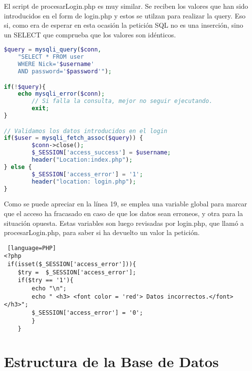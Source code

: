 \documentclass[12pt]{report}
\begin{document}
El script de procesarLogin.php es muy similar. Se reciben los valores que han sido introducidos en el form de login.php y estos se utilzan para realizar la query. Eso si, como era de esperar en esta ocasión la petición SQL no es una inserción, sino un SELECT que comprueba que los valores son idénticos.
\newline
\begin{lstlisting}[language=PHP]
$query = mysqli_query($conn, 
    "SELECT * FROM user 
    WHERE Nick='$username' 
    AND password='$password'");

if(!$query){ 
    echo mysqli_error($conn);
        // Si falla la consulta, mejor no seguir ejecutando.
        exit;
} 

// Validamos los datos introducidos en el login
if($user = mysqli_fetch_assoc($query)) {
        $conn->close();
        $_SESSION['access_success'] = $username;
        header("Location:index.php");
} else {
        $_SESSION['access_error'] = '1';
        header("location: login.php");
}
\end{lstlisting}

Como se puede apreciar en la línea 19, se emplea una variable global para marcar que el acceso ha fracasado en caso de que los datos sean erroneos, y otra para la situación opuesta. Estas variables son luego revisadas por login.php, que llamó a procesarLogin.php, para saber si ha devuelto un valor la petición.
\newline
\begin{lstlisting} [language=PHP]
<?php
 if(isset($_SESSION['access_error'])){
    $try =  $_SESSION['access_error'];
    if($try == '1'){
        echo "\n";
        echo " <h3> <font color = 'red'> Datos incorrectos.</font> </h3>";
        $_SESSION['access_error'] = '0';
        }
    }
\end{lstlisting}


\section{Estructura de la Base de Datos}
\newpage
\end{document}
